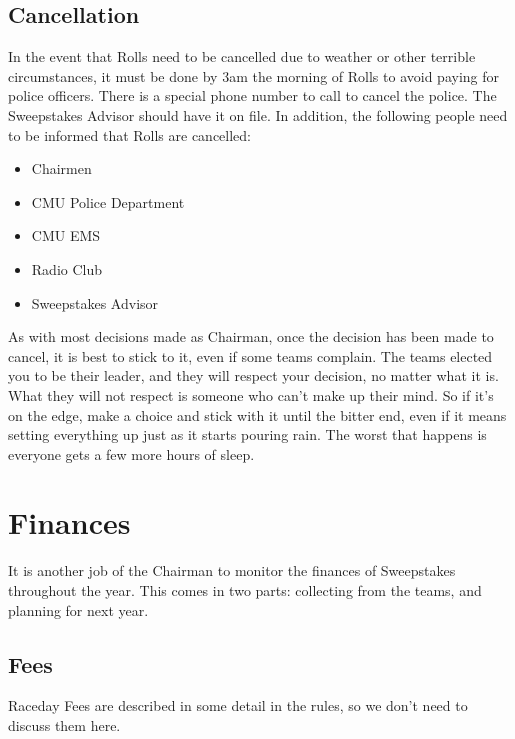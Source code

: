 \subsection{Cancellation}
In the event that Rolls need to be cancelled due to weather or other terrible
circumstances, it must be done by 3am the morning of Rolls to avoid paying
for police officers. There is a special phone number to call to cancel the
police. The Sweepstakes Advisor should have it on file.
In addition, the following people need to be informed that Rolls are cancelled:
\begin{itemize}
\item Chairmen
\item CMU Police Department
\item CMU EMS
\item Radio Club
\item Sweepstakes Advisor
\end{itemize}

As with most decisions made as Chairman, once the decision has been made to
cancel, it is best to stick to it, even if some teams complain. The teams
elected you to be their leader, and they will respect your decision, no
matter what it is. What they will not respect is someone who can't make up
their mind. So if it's on the edge, make a choice and stick with it until
the bitter end, even if it means setting everything up just as it starts
pouring rain. The worst that happens is everyone gets a few more hours of
sleep.


\section{Finances}
\label{sec:Finances}
It is another job of the Chairman to monitor the finances of Sweepstakes
throughout the year. This comes in two parts: collecting from the teams, and
planning for next year.

\subsection{Fees}
Raceday Fees are described in some detail in the rules, so we don't need
to discuss them here.


